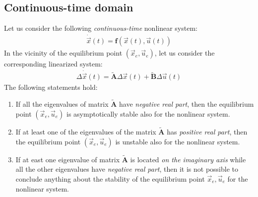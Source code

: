 \documentclass[12pt,a4paper,oneside]{book}
\begin{document}
\begin{onehalfspace}
\subsection{Continuous-time domain}
Let us consider the following \textit{continuous-time} nonlinear system:
\begin{equation}\label{eqlyap1}
	\begin{aligned}
		\dot{\vec{x}}(t)=\mathbf{f}\left(\vec{x}(t),\vec{u}(t)\right) 
	\end{aligned}
\end{equation}
In the vicinity of the equilibrium point $(\vec{x}_e,\vec{u}_e)$, let us 
consider the corresponding linearized system:
\begin{equation}\label{eqlyap2}
	\begin{aligned}
		\Delta\dot{\vec{x}}(t)=\tilde{\mathbf{A}}\Delta\vec{x}(t)+\tilde{\mathbf{B}}\Delta\vec{u}(t)
	\end{aligned}
\end{equation}
The following statements hold:
\begin{enumerate}
	\item If all the eigenvalues of matrix $\tilde{\mathbf{A}}$ have 
	\textit{negative real part}, then the equilibrium point $\left( \vec{x}_e, 
	\vec{u}_e\right)$ is asymptotically stable also for the nonlinear system.
	\item If at least one of the eigenvalues of the matrix $\tilde{\mathbf{A}}$ 
	has \textit{positive real part}, then the equilibrium point $\left( 
	\vec{x}_e, \vec{u}_e\right)$ is unstable also for the nonlinear system.
	\item If at east one eigenvalue of matrix $\tilde{\mathbf{A}}$ is located 
	\textit{on the imaginary axis} while all the other eigenvalues have 
	\textit{negative real part}, then it is not possible to conclude anything 
	about the stability of the equilibrium point $\vec{x}_e,\vec{u}_e$ for the 
	nonlinear system.
\end{enumerate}


\end{onehalfspace}
\end{document}
